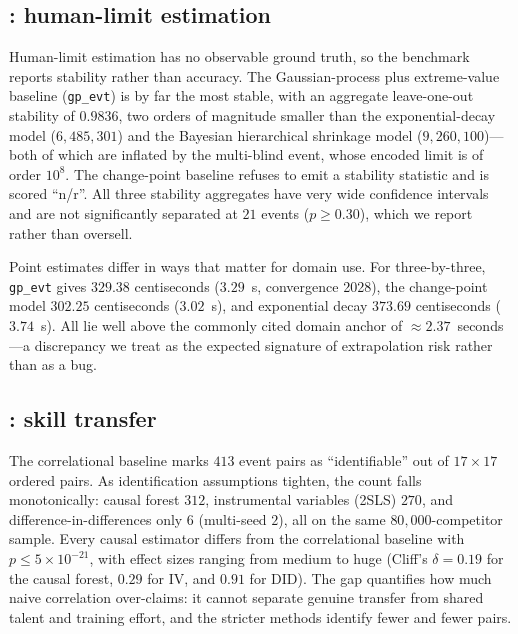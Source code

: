\subsection{: human-limit estimation}
\label{sec:results-t4}

Human-limit estimation has no observable ground truth, so the benchmark reports
stability rather than accuracy. The Gaussian-process plus extreme-value
baseline (\texttt{gp\_evt}) is by far the most stable, with an aggregate
leave-one-out stability of $0.9836$, two orders of magnitude smaller than the
exponential-decay model ($6{,}485{,}301$) and the Bayesian hierarchical
shrinkage model ($9{,}260{,}100$)---both of which are inflated by the
multi-blind event, whose encoded limit is of order $10^8$. The change-point
baseline refuses to emit a stability statistic and is scored ``n/r''. All three
stability aggregates have very wide confidence intervals and are not
significantly separated at $21$ events ($p\ge0.30$), which we report rather than
oversell.

Point estimates differ in ways that matter for domain use. For three-by-three,
\texttt{gp\_evt} gives $329.38$ centiseconds ($3.29$~s, convergence 2028),
the change-point model $302.25$ centiseconds ($3.02$~s), and exponential decay
$373.69$ centiseconds ($3.74$~s). All lie well above the commonly cited domain
anchor of $\approx 2.37$~seconds---a discrepancy we treat as the expected
signature of extrapolation risk rather than as a bug.

\subsection{: skill transfer}
\label{sec:results-t5}

The correlational baseline marks $413$ event pairs as ``identifiable'' out of
$17 \times 17$ ordered pairs. As identification assumptions tighten, the count
falls monotonically: causal forest $312$, instrumental variables (2SLS) $270$,
and difference-in-differences only $6$ (multi-seed $2$), all on the same
$80{,}000$-competitor sample. Every causal estimator differs from the
correlational baseline with $p\le5\times10^{-21}$, with effect sizes ranging
from medium to huge (Cliff's $\delta=0.19$ for the causal forest, $0.29$ for
IV, and $0.91$ for DID). The gap quantifies how much naive correlation
over-claims: it cannot separate genuine transfer from shared talent and
training effort, and the stricter methods identify fewer and fewer pairs.

